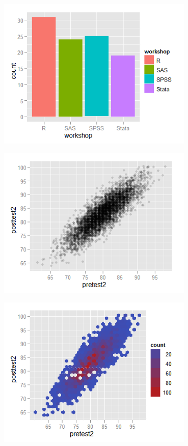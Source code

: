 \documentclass[xcolor=table,aspectratio=169]{beamer}
\begin{document}
\begin{frame}
  \includegraphics[width=0.7\textwidth]{pics/plot1.png}
\end{frame}


\begin{frame}
  \includegraphics[width=0.7\textwidth]{pics/plot2.png}
\end{frame}


\begin{frame}
  \includegraphics[width=0.7\textwidth]{pics/plot3.png}
\end{frame}
\end{document}
